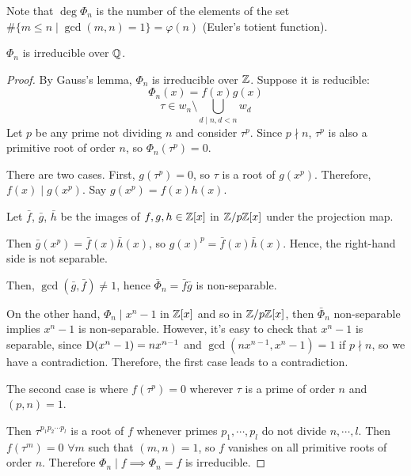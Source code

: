 \documentclass[a4paper,twoside,master.tex]{subfiles}
\begin{document}
Note that $ \deg \Phi_n $ is the number of the elements of the set $ \#\{m \leq n \mid \gcd(m ,n) = 1\} = \varphi(n) $ (Euler's totient function).

\begin{theorem}
    $ \Phi_n $ is irreducible over $ \mathbb{Q} $. 
\end{theorem}
\begin{proof}
    By Gauss's lemma, $ \Phi_n $ is irreducible over $ \mathbb{Z} $. Suppose it is reducible:
    \begin{equation}
        \Phi_n(x) = f(x) g(x)
    \end{equation}
    \begin{equation}
        \tau \in w_n \setminus \bigcup_{d\mid n, d<n} w_d
    \end{equation}
    Let $ p $ be any prime not dividing $ n $ and consider $ \tau^p $. Since $ p \nmid n $, $ \tau^p $ is also a primitive root of order $ n $, so $ \Phi_n(\tau^p) = 0 $.

    There are two cases. First, $ g(\tau^p) = 0 $, so $ \tau $ is a root of $ g(x^p) $. Therefore, $ f(x) \mid g(x^p) $. Say $ g(x^p) = f(x) h(x) $.

    Let $ \bar{f} $, $ \bar{g} $, $ \bar{h} $ be the images of $ f,g,h \in \mathbb{Z}[x] $ in $ \mathbb{Z}/p\mathbb{Z}[x] $ under the projection map.

    Then $ \bar{g}(x^p) = \bar{f}(x) \bar{h}(x) $, so $ g(x)^p = \bar{f}(x) \bar{h}(x) $. Hence, the right-hand side is not separable.

    Then, $ \gcd(\bar{g}, \bar{f}) \neq 1 $, hence $ \bar{\Phi}_n = \bar{f} \bar{g} $ is non-separable.

    On the other hand, $ \Phi_n \mid x^n - 1 $ in $ \mathbb{Z}[x] $ and so in $ \mathbb{Z}/p\mathbb{Z}[x] $, then $ \bar{\Phi}_n $ non-separable implies $ x^n - 1 $ is non-separable. However, it's easy to check that $ x^n - 1 $ is separable, since $ \mathrm{D} (x^n - 1) = nx^{n-1} $ and $ \gcd(n x^{n-1} ,x^n - 1) = 1 $ if $ p \nmid n $, so we have a contradiction. Therefore, the first case leads to a contradiction.

    The second case is where $ f(\tau^p) = 0 $ wherever $ \tau $ is a prime of order $ n $ and $ (p ,n) = 1 $.

    Then $ \tau^{p_1 p_2 \cdots p_l} $ is a root of $ f $ whenever primes $ p_1, \cdots, p_l $ do not divide $ n, \cdots, l $. Then $ f(\tau^m) = 0 $ $ \forall m $ such that $ (m,n) = 1 $, so $ f $ vanishes on all primitive roots of order $ n $. Therefore $ \Phi_n \mid f \implies \Phi_n = f $ is irreducible.
\end{proof}
\end{document}
